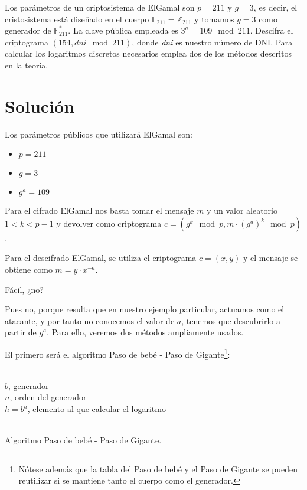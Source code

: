 	Los parámetros  de un criptosistema de ElGamal son $p = 211$ y $g = 3$, es decir, el cristosistema está
	diseñado en el cuerpo $\mathbb{F}_{211} = \mathbb{Z}_{211}$ y tomamos $g = 3$ como generador de
	$\mathbb{F}^*_{211}$. La clave pública empleada es $3^a = 109  \mod 211$. Descifra el criptograma
	$(154, \textit{dni} \mod 211)$, donde \textit{dni} es nuestro número de DNI. Para calcular los logaritmos
	discretos necesarios emplea dos de los métodos descritos en la teoría.
\section*{Solución}
	Los parámetros públicos que utilizará ElGamal son:
	\begin{itemize}
		\item $p = 211$
		\item $g = 3$
		\item $g^a = 109$
	\end{itemize}
	
	Para el cifrado ElGamal nos basta tomar el mensaje $m$ y un valor aleatorio $1 < k < p-1$ y devolver como
	criptograma $c = \left(g^k \mod p, m \cdot \left(g^a\right)^k \mod p\right)$.
	
	Para el descifrado ElGamal, se utiliza el criptograma $c = \left(x, y\right)$ y el mensaje se obtiene como
	$m = y \cdot x^{-a}$.
	
	Fácil, ¿no?
	
	Pues no, porque resulta que en nuestro ejemplo particular, actuamos como el atacante, y por tanto no conocemos
	el valor de $a$, tenemos que descubrirlo a partir de $g^a$. Para ello, veremos dos métodos ampliamente usados.
	
	El primero será el algoritmo Paso de bebé - Paso de Gigante\footnote{Nótese además que la tabla del Paso de
	bebé y el Paso de Gigante se pueden reutilizar si se mantiene tanto el cuerpo como el generador.}:
	
	\begin{algorithm}[H]
		\begin{algorithmic}[1]
			\REQUIRE \ \\
				\texttt{$b$}, generador\\
				\texttt{$n$}, orden del generador\\
				\texttt{$h = b^a$}, elemento al que calcular el logaritmo\\ \
			\ENDFOR
			
				\ELSE
				\ENDIF
			\ENDFOR
			
		\end{algorithmic}
		\caption{Algoritmo Paso de bebé - Paso de Gigante.}
		\label{BabyGiant}
	\end{algorithm}
	
